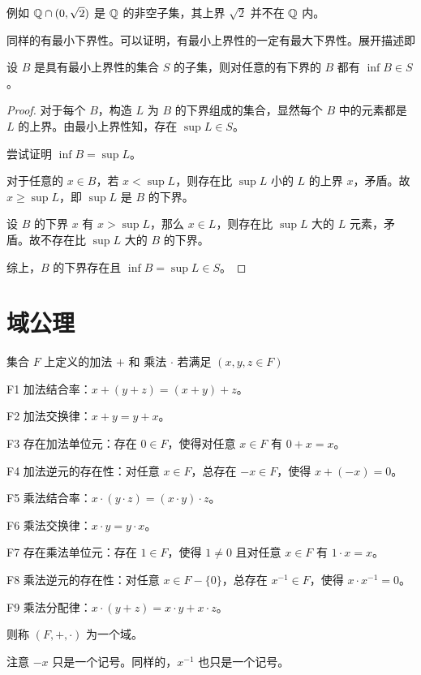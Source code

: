 例如 $\mathbb{Q} \cap (0,\sqrt2)$ 是 $\mathbb{Q}$ 的非空子集，其上界 $\sqrt2$ 并不在 $\mathbb{Q}$ 内。

同样的有最小下界性。可以证明，有最小上界性的一定有最大下界性。展开描述即

\begin{theorem}
	设 $B$ 是具有最小上界性的集合 $S$ 的子集，则对任意的有下界的 $B$ 都有 $\inf B \in S$。
\end{theorem}

\begin{proof}
	对于每个 $B$，构造 $L$ 为 $B$ 的下界组成的集合，显然每个 $B$ 中的元素都是 $L$ 的上界。由最小上界性知，存在 $\sup L \in S$。

	尝试证明 $\inf B=\sup L$。
	
	对于任意的 $x\in B$，若 $x<\sup L$，则存在比 $\sup L$ 小的 $L$ 的上界 $x$，矛盾。故 $x \geqslant \sup L$，即 $\sup L$ 是 $B$ 的下界。

	设 $B$ 的下界 $x$ 有 $x>\sup L$，那么 $x\in L$，则存在比 $\sup L$ 大的 $L$ 元素，矛盾。故不存在比 $\sup L$ 大的 $B$ 的下界。

	综上，$B$ 的下界存在且 $\inf B=\sup L \in S$。
\end{proof}

\section{域公理}

集合 $F$ 上定义的加法 $+$ 和 乘法 $\cdot$ 若满足 $(x,y,z\in F)$

F1 加法结合率：$x+(y+z) = (x+y)+z$。

F2 加法交换律：$x+y = y+x$。

F3 存在加法单位元：存在 $0\in F$，使得对任意 $x\in F$ 有 $0+x=x$。

F4 加法逆元的存在性：对任意 $x\in F$，总存在 $-x\in F$，使得 $x+(-x)=0$。

F5 乘法结合率：$x\cdot (y\cdot z) = (x\cdot y)\cdot z$。

F6 乘法交换律：$x\cdot y = y\cdot x$。

F7 存在乘法单位元：存在 $1\in F$，使得 $1\ne 0$ 且对任意 $x\in F$ 有 $1\cdot x=x$。

F8 乘法逆元的存在性：对任意 $x\in F-\{0\}$，总存在 $x^{-1}\in F$，使得 $x\cdot x^{-1} =0$。

F9 乘法分配律：$x \cdot (y+z) = x\cdot y + x\cdot z$。

则称 $(F,+,\cdot)$ 为一个域。

注意 $-x$ 只是一个记号。同样的，$x^{-1}$ 也只是一个记号。

